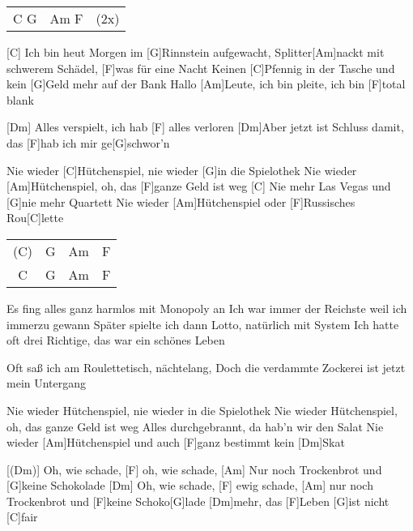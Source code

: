 

\begin{guitar}
	{\footnotesize\begin{tabular}{l|l l}
			C G & Am F & (2x)
	\end{tabular}}
	
	[C] Ich bin heut Morgen im [G]Rinnstein aufgewacht,
	Splitter[Am]nackt mit schwerem Schädel, [F]was für eine Nacht
	Keinen [C]Pfennig in der Tasche und kein [G]Geld mehr auf der Bank
	Hallo [Am]Leute, ich bin pleite, ich bin [F]total blank
	
	[Dm] Alles verspielt, ich hab [F] alles verloren
	[Dm]Aber jetzt ist Schluss damit, das [F]hab ich mir ge[G]schwor'n
	
	
	Nie wieder [C]Hütchenspiel, nie wieder [G]in die Spielothek
	Nie wieder [Am]Hütchenspiel, oh, das [F]ganze Geld ist weg
	[C] Nie mehr Las Vegas und [G]nie mehr Quartett
	Nie wieder [Am]Hütchenspiel oder [F]Russisches Rou[C]lette
	
	{\footnotesize\begin{tabular}{c|c|c|c}
			(C) & G & Am & F\\
			C & G & Am & F
	\end{tabular}}
	
	Es fing alles ganz harmlos mit Monopoly an
	Ich war immer der Reichste weil ich immerzu gewann
	Später spielte ich dann Lotto, natürlich mit System
	Ich hatte oft drei Richtige, das war ein schönes Leben
	
	Oft saß ich am Roulettetisch, nächtelang,
	Doch die verdammte Zockerei ist jetzt mein Untergang
	
	\pagebreak
	Nie wieder Hütchenspiel, nie wieder in die Spielothek
	Nie wieder Hütchenspiel, oh, das ganze Geld ist weg
	Alles durchgebrannt, da hab'n wir den Salat
	Nie wieder [Am]Hütchenspiel und auch [F]ganz bestimmt kein [Dm]Skat
	
	[(Dm)] Oh, wie schade, [F] oh, wie schade,
	[Am] Nur noch Trockenbrot und [G]keine Schokolade
	[Dm] Oh, wie schade, [F] ewig schade,
	[Am] nur noch Trockenbrot und [F]keine Schoko[G]lade [Dm]mehr,
	das [F]Leben [G]ist nicht [C]fair
	

\end{guitar}
